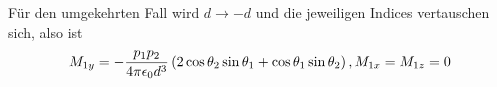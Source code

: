 \documentclass[a4paper,german,12pt,smallheadings]{scrartcl}
\begin{document}
\begin{enumerate}[a)]
    Für den umgekehrten Fall wird $d \to -d$ und die jeweiligen Indices
    vertauschen sich, also ist
    \begin{equation}
      M_{1y} = -\frac{p_1p_2}{4 \pi \epsilon_0 d^3} \del{
        2 \cos \theta_2 \sin \theta_1 + \cos \theta_1 \sin \theta_2
      }, M_{1x} = M_{1z} = 0
    \end{equation}
\end{enumerate}
\end{document}
